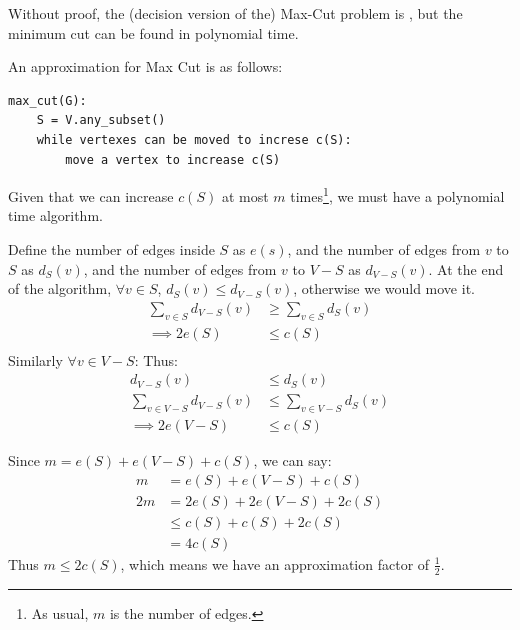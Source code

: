                     Without proof, the (decision version of the) Max-Cut problem is \npcomplete, but the minimum cut can be found in polynomial time.

                    An approximation for Max Cut is as follows:
                    \begin{lstlisting}
max_cut(G):
    S = V.any_subset()
    while vertexes can be moved to increse c(S):
        move a vertex to increase c(S)
                    \end{lstlisting}
                    Given that we can increase $c(S)$ at most $m$ times\footnote{As usual, $m$ is the number of edges.}, we must have a polynomial time algorithm.

                    Define the number of edges inside $S$ as $e(s)$, and the number of edges from $v$ to $S$ as $d_S(v)$, and the number of edges from $v$ to $V-S$ as $d_{V-S}(v)$.
                    At the end of the algorithm, $\forall v \in S$, $d_S(v) \le d_{V-S}(v)$, otherwise we would move it.
                    \begin{align*}
                        \sum_{v \in S} d_{V - S}(v) &\ge \sum_{v \in S} d_S(v) \\
                        \implies 2e(S) &\le c(S) \\
                    \end{align*}
                    Similarly $\forall v \in V-S$:
                    Thus:
                    \begin{align*}
                        d_{V-S}(v) &\le d_{S}(v) \\
                        \sum_{v \in V-S} d_{V-S}(v) &\le \sum_{v \in V-S} d_S(v) \\
                        \implies 2e(V-S) &\le c(S)
                    \end{align*}

                    Since $m = e(S) + e(V-S) + c(S)$, we can say:
                    \begin{align*}
                        m &= e(S) + e(V-S) + c(S) \\
                        2m &= 2e(S) + 2e(V-S) + 2c(S) \\
                        &\le c(S) + c(S) + 2c(S) \\
                        &= 4c(S)
                    \end{align*}
                    Thus $m \le 2 c(S)$, which means we have an approximation factor of $\frac{1}{2}$.

